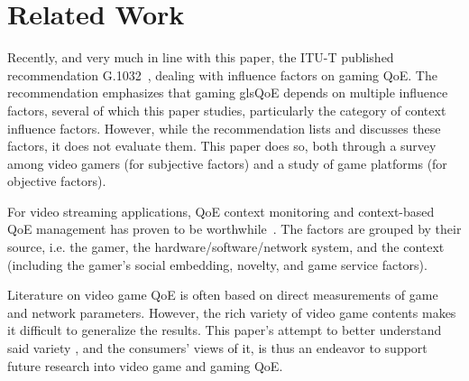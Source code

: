 \section{Related Work}
\label{sec:relatedwork}

Recently, and very much in line with this paper, the \acrshort{ITU-T}
published recommendation G.1032~\cite{mollertowards, itutg1032}, dealing with
influence factors on gaming \gls{QoE}.
The recommendation emphasizes that gaming gls{QoE} depends on multiple
influence factors, several of which this paper studies,
particularly the category of context influence factors.
However, while the recommendation lists and discusses these factors,
it does not evaluate them. This paper does so, both through a survey
among video gamers (for subjective factors) and a study of
game platforms (for objective factors).

For video streaming applications, \gls{QoE} context
monitoring and context-based \gls{QoE} management has proven to be
worthwhile~\cite{7140480}. The factors are grouped by
their source, i.e. the gamer, the hardware/software/network system,
and the context (including the gamer's social embedding, novelty,
and game service factors).

Literature on video game \gls{QoE} is often based on
direct measurements of game and network parameters. However, the
rich variety of video game contents makes it difficult to generalize
the results. This paper's attempt to better understand said variety
, and the consumers' views of it, is thus an endeavor to support future
research into video game and gaming \gls{QoE}.

